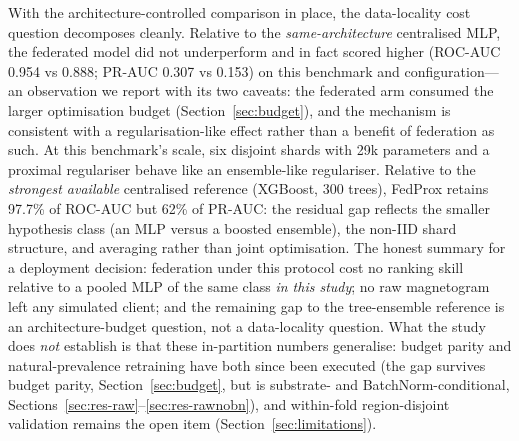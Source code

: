 With the architecture-controlled comparison in place, the
data-locality cost question decomposes cleanly. Relative to the
\emph{same-architecture} centralised MLP, the federated model did not
underperform and in fact scored higher (ROC-AUC 0.954 vs 0.888; PR-AUC
0.307 vs 0.153) on this benchmark and configuration---an observation we
report with its two caveats: the federated arm consumed the larger
optimisation budget (Section~\ref{sec:budget}), and the mechanism is
consistent with a regularisation-like effect rather than a benefit of
federation as such. At this benchmark's scale, six disjoint shards with
29k parameters and a proximal regulariser behave like an
ensemble-like regulariser. Relative to the \emph{strongest available}
centralised reference (XGBoost, 300 trees), FedProx retains 97.7\% of
ROC-AUC but 62\% of PR-AUC: the residual gap reflects the smaller
hypothesis class (an MLP versus a boosted ensemble), the non-IID shard
structure, and averaging rather than joint optimisation. The honest
summary for a deployment decision: federation under this protocol cost
no ranking skill relative to a pooled MLP of the same class \emph{in
this study}; no raw magnetogram left any simulated client; and the
remaining gap to the tree-ensemble reference is an architecture-budget
question, not a data-locality question. What the study does \emph{not}
establish is that these in-partition numbers generalise: budget
parity and natural-prevalence retraining have both since been
executed (the gap survives budget parity, Section~\ref{sec:budget},
but is substrate- and BatchNorm-conditional,
Sections~\ref{sec:res-raw}--\ref{sec:res-rawnobn}), and within-fold region-disjoint
validation remains the open item (Section~\ref{sec:limitations}).

